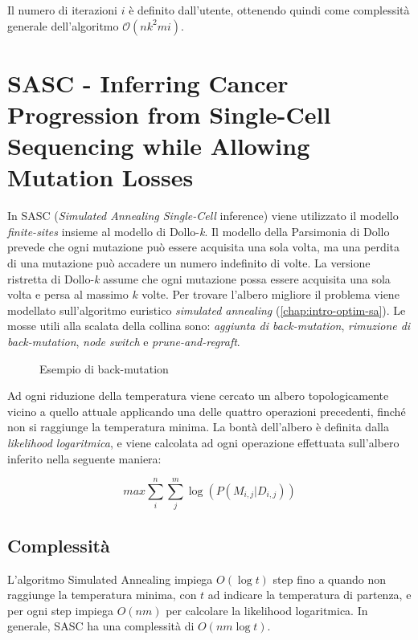 Il numero di iterazioni $i$ è definito dall'utente, ottenendo quindi come complessità generale dell'algoritmo $\mathcal{O}(nk^2mi)$.

\section{SASC - Inferring Cancer Progression from Single-Cell Sequencing while Allowing Mutation Losses \cite{SCiccolellaSasc}}
\label{chap:art-sasc}
In SASC (\textit{Simulated Annealing Single-Cell} inference) viene utilizzato il modello \textit{finite-sites} insieme al modello di Dollo-\textit{k}. Il modello della Parsimonia di Dollo prevede che ogni mutazione può essere acquisita una sola volta, ma una perdita di una mutazione può accadere un numero indefinito di volte. La versione ristretta di Dollo-\textit{k} assume che ogni mutazione possa essere acquisita una sola volta e persa al massimo $k$ volte. Per trovare l'albero migliore il problema viene modellato sull'algoritmo euristico \textit{simulated annealing} (\autoref{chap:intro-optim-sa}). Le mosse utili alla scalata della collina sono: \textit{aggiunta di back-mutation}, \textit{rimuzione di back-mutation}, \textit{node switch} e \textit{prune-and-regraft}.

\begin{figure}[h]
  \centering
  \caption{Esempio di back-mutation}
  \label{fig:art-sasc-bm}
\end{figure}

Ad ogni riduzione della temperatura viene cercato un albero topologicamente vicino a quello attuale applicando una delle quattro operazioni precedenti, finché non si raggiunge la temperatura minima. La bontà dell'albero è definita dalla \textit{likelihood logaritmica}, e viene calcolata ad ogni operazione effettuata sull'albero inferito nella seguente maniera:

\begin{equation}
  \label{eq:art-sasc-lh}
  max \sum_i^n \sum_j^m \log ( P( M_{i,j} | D_{i,j} ) )
\end{equation}

\subsection{Complessità}
L'algoritmo Simulated Annealing impiega $O(\log t)$ step fino a quando non raggiunge la temperatura minima, con $t$ ad indicare la temperatura di partenza, e per ogni step impiega $O(n m)$ per calcolare la likelihood logaritmica. In generale, SASC ha una complessità di $O(nm \log t)$.

  